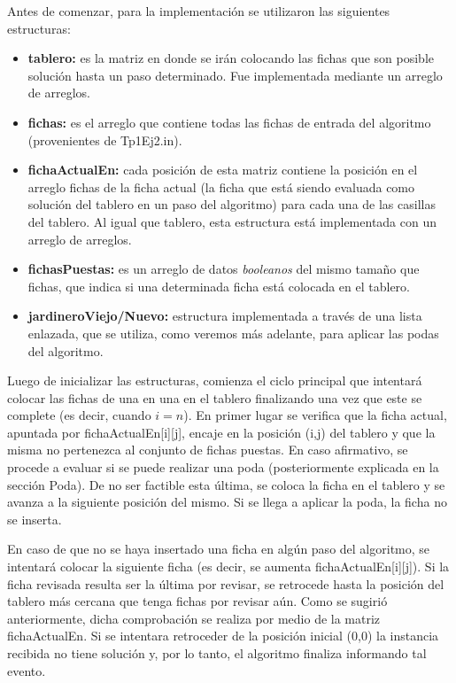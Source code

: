 \documentclass[a4paper,11pt] {article}
\begin{document}
Antes de comenzar, para la implementaci\'on se utilizaron las siguientes estructuras:
\begin{itemize}
 \item \textbf{tablero:} es la matriz en donde se ir\'an colocando las fichas que son posible soluci\'on hasta un paso determinado. Fue implementada mediante un arreglo de arreglos.
\item \textbf{fichas:} es el arreglo que contiene todas las fichas de entrada del algoritmo (provenientes de Tp1Ej2.in).
\item \textbf{fichaActualEn:} cada posici\'on de esta matriz contiene la posici\'on en el arreglo fichas de la ficha actual (la ficha que est\'a siendo evaluada como soluci\'on del tablero en un paso del algoritmo) para cada una de las casillas del tablero. Al igual que tablero, esta estructura est\'a implementada con un arreglo de arreglos.
\item \textbf{fichasPuestas:} es un arreglo de datos \textit{booleanos} del mismo tama\~{n}o que fichas, que indica si una determinada ficha est\'a colocada en el tablero.
\item \textbf{jardineroViejo/Nuevo:} estructura implementada a trav\'es de una lista enlazada, que se utiliza, como veremos m\'as adelante, para aplicar las podas del algoritmo.
\end{itemize}

Luego de inicializar las estructuras, comienza el ciclo principal que intentar\'a colocar las fichas de una en una en el tablero finalizando una vez que este se complete (es decir, cuando $i = n$). En primer lugar se verifica que la ficha actual, apuntada por fichaActualEn[i][j], encaje en la posici\'on (i,j) del tablero y que la misma no pertenezca al conjunto de fichas puestas. En caso afirmativo, se procede a evaluar si se puede realizar una poda (posteriormente explicada en la secci\'on Poda). De no ser factible esta \'ultima, se coloca la ficha en el tablero y se avanza a la siguiente posici\'on del mismo. Si se llega a aplicar la poda, la ficha no se inserta.

En caso de que no se haya insertado una ficha en alg\'un paso del algoritmo, se intentar\'a colocar la siguiente ficha (es decir, se aumenta fichaActualEn[i][j]). Si la ficha revisada resulta ser la \'ultima por revisar, se retrocede hasta la posici\'on del tablero m\'as cercana que tenga fichas por revisar a\'un. Como se sugiri\'o anteriormente, dicha comprobaci\'on se realiza por medio de la matriz fichaActualEn. Si se intentara retroceder de la posici\'on inicial (0,0) la instancia recibida no tiene soluci\'on y, por lo tanto, el algoritmo finaliza informando tal evento.
\end{document}
